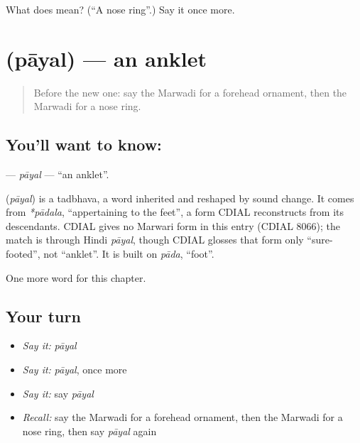 \begin{tcolorbox}[breakable,colback=teal!4,colframe=teal!35!black,title={Before you move on}]
What does  mean? (\textquotedblleft{}A nose ring\textquotedblright{}.) Say it once more.
\end{tcolorbox}
\section[\texorpdfstring{\mw{पायल} (pāyal)}{पायल (pāyal)}]{ (pāyal) — an anklet}

\label{lesson:MW-C130-payal}



\begin{quote}
Before the new one: say the Marwadi for a forehead ornament, then the Marwadi for a nose ring.
\end{quote}

\subsection*{You'll want to know: }
\textbf{} — \emph{pāyal} — \textquotedblleft{}an anklet\textquotedblright{}.

\begin{cousinweb}
\textbf{} (\emph{pāyal}) is a tadbhava, a word inherited and reshaped by sound change. It comes from \emph{*pādala}, \textquotedblleft{}appertaining to the feet\textquotedblright{}, a form CDIAL reconstructs from its descendants. CDIAL gives no Marwari form in this entry (CDIAL 8066); the match is through Hindi \emph{pāyal}, though CDIAL glosses that form only \textquotedblleft{}sure-footed\textquotedblright{}, not \textquotedblleft{}anklet\textquotedblright{}. It is built on \emph{pāda}, \textquotedblleft{}foot\textquotedblright{}.
\end{cousinweb}

\begin{grammarlens}[title={What you've built}]
One more word for this chapter.
\end{grammarlens}

\subsection*{Your turn}
\begin{itemize}
\raggedright
  \item \emph{Say it:} \emph{pāyal}
  \item \emph{Say it:} \emph{pāyal}, once more
  \item \emph{Say it:} say \emph{pāyal}
  \item \emph{Recall:} say the Marwadi for a forehead ornament, then the Marwadi for a nose ring, then say \emph{pāyal} again
\end{itemize}

